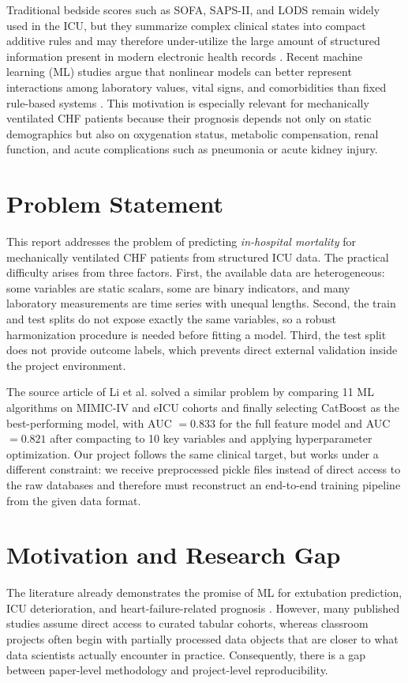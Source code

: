 \documentclass[a4paper,12pt]{extreport}
\begin{document}
Traditional bedside scores such as SOFA, SAPS-II, and LODS remain widely used in the ICU, but they summarize complex clinical states into compact additive rules and may therefore under-utilize the large amount of structured information present in modern electronic health records \cite{lambden2019sofa,legall1996lods,salluh2014icu}. Recent machine learning (ML) studies argue that nonlinear models can better represent interactions among laboratory values, vital signs, and comorbidities than fixed rule-based systems \cite{obermeyer2016predicting,zhu2021ml}. This motivation is especially relevant for mechanically ventilated CHF patients because their prognosis depends not only on static demographics but also on oxygenation status, metabolic compensation, renal function, and acute complications such as pneumonia or acute kidney injury.

\section{Problem Statement}
This report addresses the problem of predicting \textit{in-hospital mortality} for mechanically ventilated CHF patients from structured ICU data. The practical difficulty arises from three factors. First, the available data are heterogeneous: some variables are static scalars, some are binary indicators, and many laboratory measurements are time series with unequal lengths. Second, the train and test splits do not expose exactly the same variables, so a robust harmonization procedure is needed before fitting a model. Third, the test split does not provide outcome labels, which prevents direct external validation inside the project environment.

The source article of Li et al. \cite{li2022prediction} solved a similar problem by comparing 11 ML algorithms on MIMIC-IV and eICU cohorts and finally selecting CatBoost as the best-performing model, with AUC \(= 0.833\) for the full feature model and AUC \(= 0.821\) after compacting to 10 key variables and applying hyperparameter optimization. Our project follows the same clinical target, but works under a different constraint: we receive preprocessed pickle files instead of direct access to the raw databases and therefore must reconstruct an end-to-end training pipeline from the given data format.

\section{Motivation and Research Gap}
The literature already demonstrates the promise of ML for extubation prediction, ICU deterioration, and heart-failure-related prognosis \cite{zhao2021development,fabregat2021machine,angraal2020machine,awan2019machine}. However, many published studies assume direct access to curated tabular cohorts, whereas classroom projects often begin with partially processed data objects that are closer to what data scientists actually encounter in practice. Consequently, there is a gap between paper-level methodology and project-level reproducibility.
\end{document}
